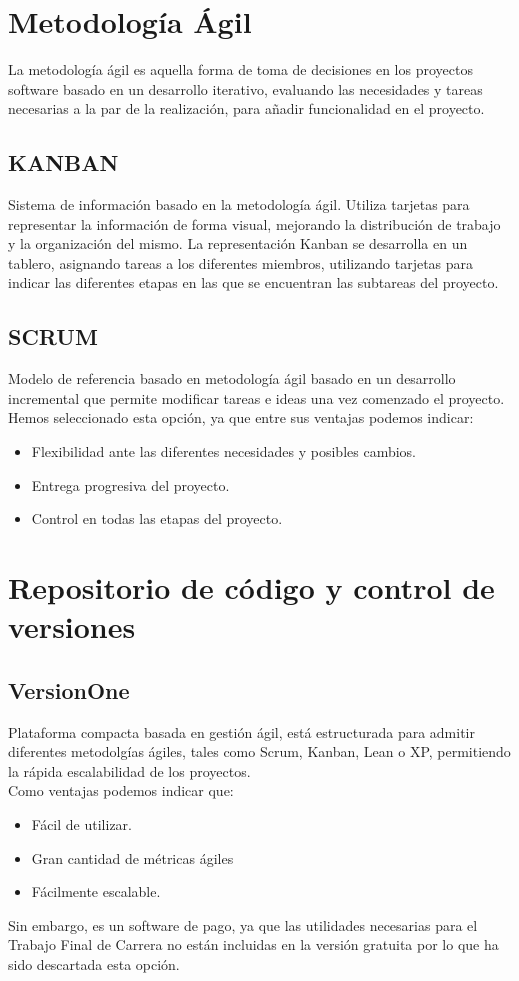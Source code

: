 
\section{Metodología Ágil}

La metodología ágil es aquella forma de toma de decisiones en los proyectos software basado en un desarrollo iterativo, evaluando las necesidades y tareas necesarias a la par de la realización, para añadir funcionalidad en el proyecto.\cite{wiki:desarrollo}\\ 
\subsection{KANBAN}
Sistema de información basado en la metodología ágil. Utiliza tarjetas para representar la información de forma visual, mejorando la distribución de trabajo y la organización del mismo. \cite{ kanban:metodo}
La representación Kanban se desarrolla en un tablero, asignando tareas a los diferentes miembros, utilizando tarjetas para indicar las diferentes etapas en las que se encuentran las subtareas del proyecto. \cite{wiki:kanban}
 
\subsection{SCRUM}
Modelo de referencia basado en metodología ágil basado en un desarrollo incremental que permite modificar tareas e ideas una vez comenzado el proyecto. \nocite{agile:scrum}
Hemos seleccionado esta opción, ya que entre sus ventajas podemos indicar: 
\begin{itemize}
\item Flexibilidad ante las diferentes necesidades y posibles cambios. \nocite{proyectos:scrum}
\item Entrega progresiva del proyecto. 
\item Control en todas las etapas del proyecto. 
\end{itemize}
\section{Repositorio de código y control de versiones}
\subsection{VersionOne}
\nonzeroparskip
Plataforma compacta basada en gestión ágil, está estructurada para admitir diferentes metodolgías ágiles, tales como Scrum, Kanban, Lean o XP, permitiendo la rápida escalabilidad de los proyectos. \cite{versionOne:soporte} \\
Como ventajas podemos indicar que: 
\begin{itemize}
\item Fácil de utilizar. 
\item Gran cantidad de métricas ágiles 
\item Fácilmente escalable. 
\end{itemize}
Sin embargo, es un software de pago, ya que las utilidades necesarias para el Trabajo Final de Carrera no están incluidas en la versión gratuita por lo que ha sido descartada esta opción. 
